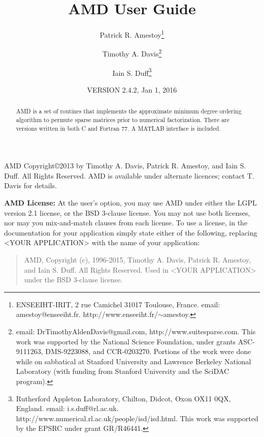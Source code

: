 \documentclass[11pt]{article}
\begin{document}

\title{AMD User Guide}
\author{Patrick R. Amestoy\thanks{ENSEEIHT-IRIT,
2 rue Camichel 31017 Toulouse, France.
email: amestoy@enseeiht.fr.  http://www.enseeiht.fr/$\sim$amestoy.}
\and Timothy A. Davis\thanks{
email: DrTimothyAldenDavis@gmail.com,
http://www.suitesparse.com.
This work was supported by the National
Science Foundation, under grants ASC-9111263, DMS-9223088, and CCR-0203270.
Portions of the work were done while on sabbatical at Stanford University
and Lawrence Berkeley National Laboratory (with funding from Stanford
University and the SciDAC program).
}
\and Iain S. Duff\thanks{Rutherford Appleton Laboratory, Chilton, Didcot, 
Oxon OX11 0QX, England. email: i.s.duff@rl.ac.uk.  
http://www.numerical.rl.ac.uk/people/isd/isd.html.
This work was supported by the EPSRC under grant GR/R46441.
}}

\date{VERSION 2.4.2, Jan 1, 2016}
\maketitle

\begin{abstract}
AMD is a set of routines that implements the approximate minimum degree ordering
algorithm to permute sparse matrices prior to
numerical factorization.
There are versions written in both C and Fortran 77.
A MATLAB interface is included.
\end{abstract}

AMD Copyright\copyright 2013 by Timothy A.
Davis, Patrick R. Amestoy, and Iain S. Duff.  All Rights Reserved.
AMD is available under alternate licences; contact T. Davis for details.

{\bf AMD License:}
At the user's option, you may use AMD under either the LGPL
version 2.1 license, or the BSD 3-clause license.  You may not use both
licenses, nor may you mix-and-match clauses from each license.  To use a
license, in the documentation for your application simply state either of the
following, replacing <YOUR APPLICATION> with the name of your application:

    \begin{quote}
    AMD, Copyright (c), 1996-2015, Timothy A. Davis,
    Patrick R. Amestoy, and Iain S. Duff.  All Rights Reserved.
    Used in <YOUR APPLICATION> under the BSD 3-clause license.
    \end{quote}
\end{document}
